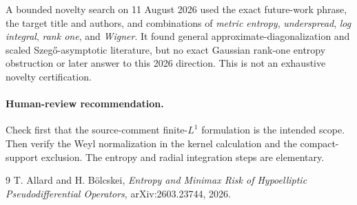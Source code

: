\documentclass[11pt]{article}
\begin{document}
A bounded novelty search on 11 August 2026 used the exact future-work phrase,
the target title and authors, and combinations of \emph{metric entropy},
\emph{underspread}, \emph{log integral}, \emph{rank one}, and \emph{Wigner}.
It found general approximate-diagonalization and scaled Szeg\H{o}-asymptotic
literature, but no exact Gaussian rank-one entropy obstruction or later answer
to this 2026 direction.  This is not an exhaustive novelty certification.

\paragraph{Human-review recommendation.}
Check first that the source-comment finite-$L^1$ formulation is the intended
scope.  Then verify the Weyl normalization in the kernel calculation and the
compact-support exclusion.  The entropy and radial integration steps are
elementary.

\begin{thebibliography}{9}
T. Allard and H. B\"olcskei,
\emph{Entropy and Minimax Risk of Hypoelliptic Pseudodifferential Operators},
arXiv:2603.23744, 2026.
\end{thebibliography}
\end{document}
